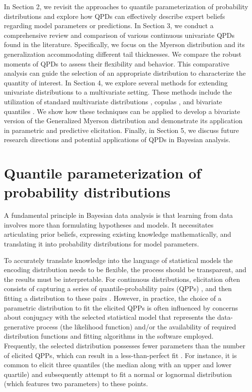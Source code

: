 \documentclass[
  fleqn,
  deca,
  blindrev
]{informs4}
\begin{document}
In Section 2, we revisit the approaches to quantile parameterization of
probability distributions and explore how QPDs can effectively describe
expert beliefs regarding model parameters or predictions. In Section 3,
we conduct a comprehensive review and comparison of various continuous
univariate QPDs found in the literature. Specifically, we focus on the
Myerson distribution and its generalization accommodating different tail
thicknesses. We compare the robust moments of QPDs to assess their
flexibility and behavior. This comparative analysis can guide the
selection of an appropriate distribution to characterize the quantity of
interest. In Section 4, we explore several methods for extending
univariate distributions to a multivariate setting. These methods
include the utilization of standard multivariate distributions
\citep{drovandi2011LikelihoodfreeBayesianEstimation}, copulas
\citep{hoff2007ExtendingRankLikelihood}, and bivariate quantiles
\citep{nair2023PropertiesBivariateDistributions, vineshkumar2019BivariateQuantileFunctions}.
We show how these techniques can be applied to develop a bivariate
version of the Generalized Myerson distribution and demonstrate its
application in parametric and predictive elicitation. Finally, in
Section 5, we discuss future research directions and potential
applications of QPDs in Bayesian analysis.

\section{Quantile parameterization of probability
distributions}\label{quantile-parameterization-of-probability-distributions}

A fundamental principle in Bayesian data analysis is that learning from
data involves more than formulating hypotheses and models. It
necessitates articulating prior beliefs, expressing existing knowledge
mathematically, and translating it into probability distributions for
model parameters.

To accurately translate knowledge into the language of statistical
models the encoding distribution needs to be flexible, the process
should be transparent, and the results must be interpretable. For
continuous distributions, elicitation often consists of capturing a
series of quantile-probability pairs (QPPs)
\citep{kadane1998ExperiencesElicitation, morgan2014UseAbuseExpert}, and
then fitting a distribution to these pairs
\citep{ohagan2019ExpertKnowledgeElicitation}. However, in practice, the
choice of a parametric distribution to fit the elicited QPPs is often
influenced by concerns about conjugacy with the selected statistical
model that represents the data-generative process (the likelihood
function) and/or the availability of required distribution functions and
fitting algorithms in the software employed. Frequently, the selected
distribution possesses fewer parameters than the number of elicited
QPPs, which can result in a less-than-perfect fit
\citep{ohagan2019ExpertKnowledgeElicitation}. For instance, it is common
to elicit three quantiles (the median along with an upper and lower
quartile) and subsequently attempt to fit a normal or lognormal
distribution (which features two parameters) to these points.
\end{document}
